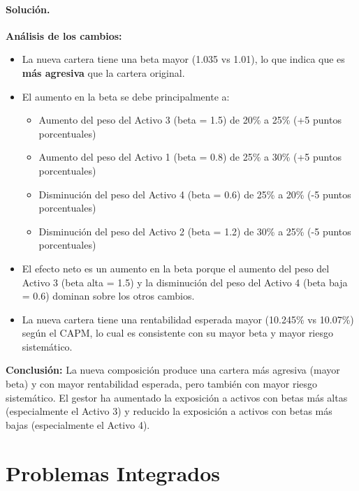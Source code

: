 \documentclass[12pt,a4paper]{article}
\newenvironment{solucion}{\paragraph{Solución.}}{}
\begin{document}
\begin{solucion}
\begin{enumerate}[label=\alph*)]
  \textbf{Análisis de los cambios:}
  \begin{itemize}
    \item La nueva cartera tiene una beta mayor (1.035 vs 1.01), lo que indica que es \textbf{más agresiva} que la cartera original.
    \item El aumento en la beta se debe principalmente a:
      \begin{itemize}
        \item Aumento del peso del Activo 3 (beta = 1.5) de 20\% a 25\% (+5 puntos porcentuales)
        \item Aumento del peso del Activo 1 (beta = 0.8) de 25\% a 30\% (+5 puntos porcentuales)
        \item Disminución del peso del Activo 4 (beta = 0.6) de 25\% a 20\% (-5 puntos porcentuales)
        \item Disminución del peso del Activo 2 (beta = 1.2) de 30\% a 25\% (-5 puntos porcentuales)
      \end{itemize}
    \item El efecto neto es un aumento en la beta porque el aumento del peso del Activo 3 (beta alta = 1.5) y la disminución del peso del Activo 4 (beta baja = 0.6) dominan sobre los otros cambios.
    \item La nueva cartera tiene una rentabilidad esperada mayor (10.245\% vs 10.07\%) según el CAPM, lo cual es consistente con su mayor beta y mayor riesgo sistemático.
  \end{itemize}

  \textbf{Conclusión:} La nueva composición produce una cartera más agresiva (mayor beta) y con mayor rentabilidad esperada, pero también con mayor riesgo sistemático. El gestor ha aumentado la exposición a activos con betas más altas (especialmente el Activo 3) y reducido la exposición a activos con betas más bajas (especialmente el Activo 4).
\end{enumerate}
\end{solucion}

\section{Problemas Integrados}
\end{document}
